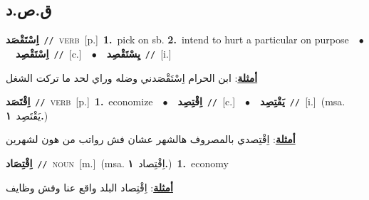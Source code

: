 \documentclass[10pt,a4paper,twoside]{article} %
\begin{document}
\begin{multicols}{2}
\vspace{-3mm}
\subsection*{\color{blue}\foreignlanguage{arabic}{ق.ص.د}\color{blue}{}} 

{\setlength\topsep{0pt}\textbf{\foreignlanguage{arabic}{اِسْتَقْصَد}}\ {\color{gray}\texttt{//}\color{black}}\ \textsc{verb}\ [p.]\ \textbf{1.}~pick on sb.  \textbf{2.}~intend to hurt a particular on purpose\ \ $\bullet$\ \ \setlength\topsep{0pt}\textbf{\foreignlanguage{arabic}{اِسْتَقْصِد}}\ {\color{gray}\texttt{//}\color{black}}\ [c.]\ \ $\bullet$\ \ \setlength\topsep{0pt}\textbf{\foreignlanguage{arabic}{يِسْتَقْصِد}}\ {\color{gray}\texttt{//}\color{black}}\ [i.]\  \begin{flushright}\color{gray}\foreignlanguage{arabic}{\textbf{\underline{\foreignlanguage{arabic}{أمثلة}}}: ابن الحرام اِسْتَقْصَدني وضله وراي لحد ما تركت الشغل}\end{flushright}\color{black}} \vspace{2mm}

{\setlength\topsep{0pt}\textbf{\foreignlanguage{arabic}{اِقْتَصَد}}\ {\color{gray}\texttt{//}\color{black}}\ \textsc{verb}\ [p.]\ \textbf{1.}~economize\ \ $\bullet$\ \ \setlength\topsep{0pt}\textbf{\foreignlanguage{arabic}{اِقْتِصِد}}\ {\color{gray}\texttt{//}\color{black}}\ [c.]\ \ $\bullet$\ \ \setlength\topsep{0pt}\textbf{\foreignlanguage{arabic}{يَقْتِصِد}}\ {\color{gray}\texttt{//}\color{black}}\ [i.]\ \color{gray}(msa. \foreignlanguage{arabic}{يَقْتَصِد}~\foreignlanguage{arabic}{\textbf{١.}})\color{black}\  \begin{flushright}\color{gray}\foreignlanguage{arabic}{\textbf{\underline{\foreignlanguage{arabic}{أمثلة}}}: اِقْتِصدي بالمصروف هالشهر عشان فش رواتب من هون لشهرين}\end{flushright}\color{black}} \vspace{2mm}

{\setlength\topsep{0pt}\textbf{\foreignlanguage{arabic}{اِقْتِصَاد}}\ {\color{gray}\texttt{//}\color{black}}\ \textsc{noun}\ [m.]\ \color{gray}(msa. \foreignlanguage{arabic}{اِقْتِصاد}~\foreignlanguage{arabic}{\textbf{١.}})\color{black}\ \textbf{1.}~economy\  \begin{flushright}\color{gray}\foreignlanguage{arabic}{\textbf{\underline{\foreignlanguage{arabic}{أمثلة}}}: اِقْتِصاد البلد واقع عنا وفش وظايف}\end{flushright}\color{black}} \vspace{2mm}


\end{multicols}
\end{document}
